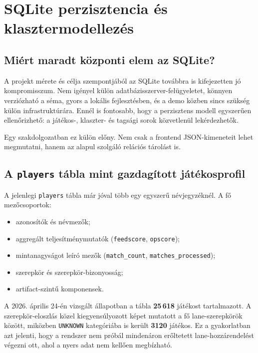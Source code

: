 \documentclass[a4paper,12pt]{report}
\begin{document}
\chapter{SQLite perzisztencia és klasztermodellezés}

\section{Miért maradt központi elem az SQLite?}

A projekt mérete és célja szempontjából az SQLite továbbra is kifejezetten jó kompromisszum. Nem igényel külön adatbázisszerver-felügyeletet, könnyen verziózható a séma, gyors a lokális fejlesztésben, és a demo közben sincs szükség külön infrastruktúrára. Ennél is fontosabb, hogy a perzisztens modell egyszerűen ellenőrizhető: a játékos-, klaszter- és tagsági sorok közvetlenül lekérdezhetők.

Egy szakdolgozatban ez külön előny. Nem csak a frontend JSON-kimeneteit lehet megmutatni, hanem az alapul szolgáló relációs tárolást is.

\section{A \texttt{players} tábla mint gazdagított játékosprofil}

A jelenlegi \texttt{players} tábla már jóval több egy egyszerű névjegyzéknél. A fő mezőcsoportok:

\begin{itemize}
    \item azonosítók és névmezők;
    \item aggregált teljesítménymutatók (\texttt{feedscore}, \texttt{opscore});
    \item mintanagyságot leíró mezők (\texttt{match\_count}, \texttt{matches\_processed});
    \item szerepkör és szerepkör-bizonyosság;
    \item artifact-szintű komponensek.
\end{itemize}

A 2026. április 24-én vizsgált állapotban a tábla \textbf{25\,618} játékost tartalmazott. A szerepkör-eloszlás közel kiegyensúlyozott képet mutatott a fő lane-szerepkörök között, miközben \texttt{UNKNOWN} kategóriába is került \textbf{3120} játékos. Ez a gyakorlatban azt jelenti, hogy a rendszer nem próbál mindenáron erőltetett lane-hozzárendelést végezni ott, ahol a nyers adat nem kellően megbízható.
\end{document}
